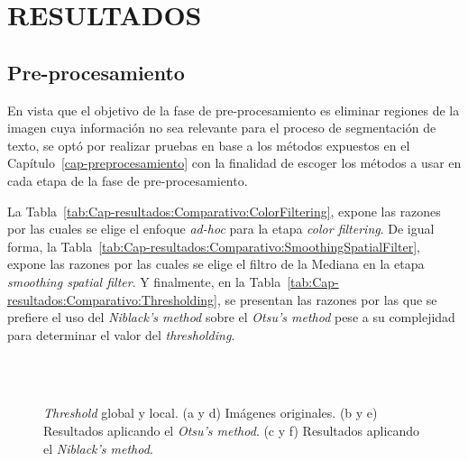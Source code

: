 \chapter{RESULTADOS}
\label{cap-resultados}

\section{Pre-procesamiento}
En vista que el objetivo de la fase de pre-procesamiento es eliminar regiones de la
imagen cuya información no sea relevante para el proceso de segmentación de 
texto, se optó por realizar pruebas en base a los métodos expuestos en el 
Capítulo~\ref{cap-preprocesamiento} con la finalidad de escoger los métodos a 
usar en cada etapa de la fase de pre-procesamiento.

La Tabla~\ref{tab:Cap-resultados:Comparativo:ColorFiltering}, expone las razones
por las cuales se elige el enfoque \textit{ad-hoc} para la etapa \textit{color 
filtering}. De igual forma, la Tabla~\ref{tab:Cap-resultados:Comparativo:SmoothingSpatialFilter}, 
expone las razones por las cuales se elige el filtro de la Mediana en la etapa
\textit{smoothing spatial filter}. Y finalmente, en la Tabla~\ref{tab:Cap-resultados:Comparativo:Thresholding}, 
se presentan las razones por las que se prefiere el uso del \textit{Niblack's
method} sobre el \textit{Otsu's method} pese a su complejidad para determinar el 
valor del \textit{thresholding}.

\begin{figure}[h!]
	\centering
   { }
   { }
   \\    

   { }
   { }
   \\
	\caption[\textit{Threshold} global y local.]{\textit{Threshold} global y 
	local. (a y d) Imágenes originales. (b y e) Resultados aplicando el
  \textit{Otsu's method}. (c y f) Resultados aplicando el \textit{Niblack's
  method}.}
	\label{Fig:Cap-resultados:threshold}
\end{figure}

